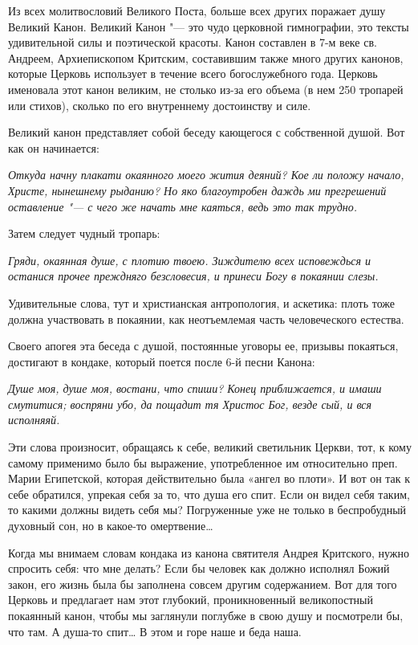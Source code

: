 Из всех молитвословий Великого Поста, больше
всех других поражает душу Великий Канон. Великий
Канон "--- это чудо церковной гимнографии, это
тексты удивительной силы и поэтической красоты.
Канон составлен в 7-м веке св. Андреем,
Архиепископом Критским, составившим также много
других канонов, которые Церковь использует в
течение всего богослужебного года. Церковь
именовала этот канон великим, не столько из-за
его объема (в нем 250 тропарей или стихов), сколько
по его внутреннему достоинству и силе. 


Великий канон представляет собой беседу
кающегося с собственной душой. Вот как он
начинается:


\itshape Откуда начну плакати окаянного моего жития
деяний? Кое ли положу начало, Христе, нынешнему
рыданию? Но яко благоутробен даждь ми
прегрешений оставление \normalfont{}"--- с чего же начать мне
каяться, ведь это так трудно. 


Затем следует чудный тропарь:


\itshape Гряди, окаянная душе, с плотию твоею. Зиждителю
всех исповеждься и останися прочее преждняго
безсловесия, и принеси Богу в покаянии слезы. \normalfont{}


Удивительные слова, тут и христианская
антропология, и аскетика: плоть тоже должна
участвовать в покаянии, как неотъемлемая часть
человеческого естества. 


Своего апогея эта беседа с душой, постоянные
уговоры ее, призывы покаяться, достигают в
кондаке, который поется после 6-й песни Канона: 


\itshape 
Душе моя, душе моя, востани, что спиши? Конец
приближается, и имаши смутитися; воспряни убо, да
пощадит тя Христос Бог, везде сый, и вся
исполняяй.\normalfont{}


Эти слова произносит, обращаясь к себе, великий
светильник Церкви, тот, к кому самому применимо
было бы выражение, употребленное им относительно
преп. Марии Египетской, которая действительно
была «ангел во плоти». И вот он так к себе
обратился, упрекая себя за то, что душа его спит.
Если он видел себя таким, то какими должны видеть
себя мы? Погруженные уже не только в беспробудный
духовный сон, но в какое-то омертвение…


Когда мы внимаем словам кондака из канона
святителя Андрея Критского, нужно спросить себя:
что мне делать? Если бы человек как должно
исполнял Божий закон, его жизнь была бы заполнена
совсем другим содержанием. Вот для того Церковь и
предлагает нам этот глубокий, проникновенный
великопостный покаянный канон, чтобы мы
заглянули поглубже в свою душу и посмотрели бы,
что там. А душа-то спит… В этом и горе наше и беда
наша. 


